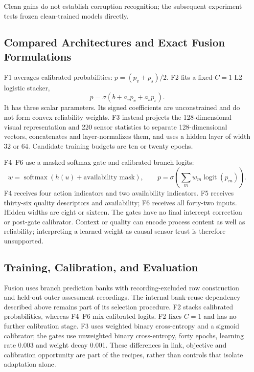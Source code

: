 Clean gains do not establish corruption recognition; the subsequent experiment tests
frozen clean-trained models directly.

\subsection{Compared Architectures and Exact Fusion Formulations}
F1 averages calibrated probabilities: $p=(p_v+p_s)/2$. F2 fits a fixed-$C=1$ L2 logistic stacker,
\begin{equation}p=\sigma(b+a_vp_v+a_sp_s).\end{equation}
It has three scalar parameters. Its signed coefficients are unconstrained and do not
form convex reliability weights. F3 instead projects the 128-dimensional visual
representation and 220 sensor statistics to separate 128-dimensional vectors,
concatenates and layer-normalizes them, and uses a hidden layer of width 32 or 64.
Candidate training budgets are ten or twenty epochs.

F4--F6 use a masked softmax gate and calibrated branch logits:
\begin{equation}w=\operatorname{softmax}(h(u)+\text{availability mask}),\qquad
p=\sigma\!\left(\sum_m w_m\operatorname{logit}(p_m)\right).\end{equation}
F4 receives four action indicators and two availability indicators. F5 receives
thirty-six quality descriptors and availability; F6 receives all forty-two inputs.
Hidden widths are eight or sixteen. The gates have no final intercept correction or
post-gate calibrator. Context or quality can encode process content as well as
reliability; interpreting a learned weight as causal sensor trust is therefore
unsupported.

\subsection{Training, Calibration, and Evaluation}
Fusion uses branch prediction banks with recording-excluded row construction and
held-out outer assessment recordings. The internal bank-reuse dependency described above
remains part of its selection procedure. F2 stacks calibrated probabilities, whereas
F4--F6 mix calibrated logits. F2 fixes $C=1$ and has no further calibration stage. F3
uses weighted binary cross-entropy and a sigmoid calibrator; the gates use unweighted
binary cross-entropy, forty epochs, learning rate 0.003 and weight decay 0.001. These
differences in link, objective and calibration opportunity are part of the recipes,
rather than controls that isolate adaptation alone.

